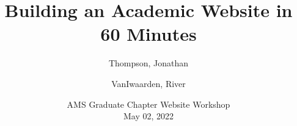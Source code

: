 \documentclass{beamer}
\title[Academic Websites with Hugo]{Building an Academic Website in 60 Minutes}
\author[Thompson, VanIwaarden]{
  Thompson, Jonathan\\
  \and
  VanIwaarden, River\\
}
\institute[UCCS]{University of Colorado at Colorado Springs}
\date[UCCS 2022]
{AMS Graduate Chapter Website Workshop \\ May 02, 2022}
\begin{document}
\frame{\titlepage}























\end{document}
